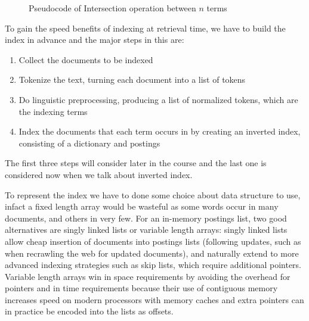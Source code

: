\begin{figure}
    \caption{Pseudocode of Intersection operation between $n$ terms}
    \label{alg:intersectionTerms}
\end{figure}
To gain the speed benefits of indexing at retrieval time, we have to build the index in advance
and the major steps in this are:
\begin{enumerate}
    \item Collect the documents to be indexed
    \item Tokenize the text, turning each document into a list of tokens
    \item Do linguistic preprocessing, producing a list of normalized tokens, which are the indexing terms
    \item Index the documents that each term occurs in by creating an inverted index,
          consisting of a dictionary and postings
\end{enumerate}
The first three steps will consider later in the course and the last one is considered now when we talk about 
inverted index.

To represent the index we have to done some choice about data structure to use, infact 
a fixed length array would be wasteful as some words occur in many documents, and others in very few.\newline
For an in-memory postings list, two good alternatives are singly linked lists or variable length arrays:
singly linked lists allow cheap insertion of documents into postings lists (following updates,
such as when recrawling the web for updated documents), and naturally extend to more advanced indexing strategies
such as skip lists, which require additional pointers.\newline
Variable length arrays win in space requirements by avoiding the overhead for pointers and in
time requirements because their use of contiguous memory increases speed on modern processors with memory caches
and extra pointers can in practice be encoded into the lists as offsets.

